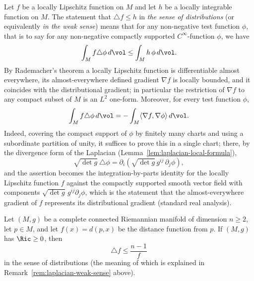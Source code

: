 \begin{remark}
\label{rem:laplacian-weak-sense}
\label{calabi}
Let $f$ be a locally Lipschitz function on $M$ and let $h$ be a
locally integrable function on $M$. The statement that $\triangle
f\leq h$ in {\sl the sense of distributions} (or equivalently {\sl
in the weak sense}) means that for any non-negative test function
$\phi$, that is to say for any non-negative compactly supported
$C^\infty$-function $\phi$, we have
$$\int_Mf\triangle \phi\, d\vol\le \int_M h\,\phi\, d\vol.$$
By Rademacher's theorem a locally Lipschitz function is
differentiable almost everywhere, its almost-everywhere defined
gradient $\nabla f$ is locally bounded, and it coincides with the
distributional gradient; in particular the restriction of $\nabla
f$ to any compact subset of $M$ is an $L^2$ one-form. Moreover, for
every test function $\phi$,
$$\int_Mf\triangle
\phi\, d\vol=-\int_M\langle \nabla f,\nabla\phi\rangle\, d\vol.$$
Indeed, covering the compact support of $\phi$ by finitely many
charts and using a subordinate partition of unity, it suffices to
prove this in a single chart; there, by the divergence form of the
Laplacian (Lemma~\ref{lem:laplacian-local-formula}),
$$\sqrt{\det g}\ \triangle\phi
=\partial_i\left(\sqrt{\det g}\,g^{ij}\,\partial_j\phi\right),$$
and the assertion becomes the integration-by-parts identity for the
locally Lipschitz function $f$ against the compactly supported
smooth vector field with components $\sqrt{\det
g}\,g^{ij}\partial_j\phi$, which is the statement that the
almost-everywhere gradient of $f$ represents its distributional
gradient (standard real analysis).
\end{remark}

\begin{example}
\label{ex:distance-function-laplacian}
Let $(M,g)$ be a complete connected Riemannian manifold of
dimension $n\ge2$, let $p\in M$, and let $f(x)=d(p,x)$ be the
distance function from $p$. If $(M, g)$ has
$\Ric \geq 0$, then
\[ \triangle f \leq \frac{n-1}{f} \]
 in the sense of distributions (the meaning of which is explained
in Remark~\ref{rem:laplacian-weak-sense} above).
\end{example}

